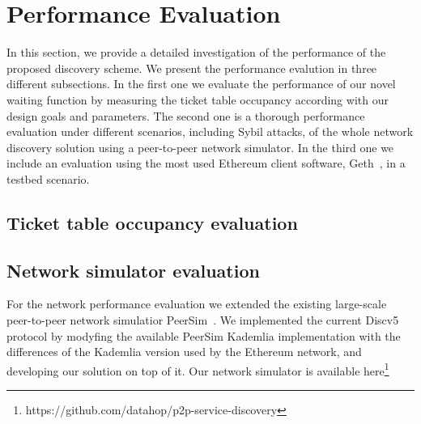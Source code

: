 
\section{Performance Evaluation}
\label{sec:eval}

In  this  section,  we  provide  a  detailed  investigation  of  the performance of the proposed discovery scheme.
We present the performance evalution in three different subsections. 
In the first one we evaluate the performance of our novel waiting function by measuring the ticket table occupancy
according with our design goals and parameters.
The second one is a thorough performance evaluation under different scenarios, including Sybil attacks, of the whole network discovery solution using a peer-to-peer network simulator.
In the third one we include an evaluation using the most used Ethereum client software, Geth~\cite{go-ethereum}, in a testbed scenario.

\subsection{Ticket table occupancy evaluation}


\subsection{Network simulator evaluation}



For the network performance evaluation we extended the existing 
large-scale peer-to-peer network simulatior PeerSim~\cite{p2p09-peersim}.
We implemented the current Discv5 protocol by modyfing the available PeerSim Kademlia implementation with the differences of the Kademlia version used by the Ethereum network, and developing our solution on top of it. Our network simulator is available here\footnote{https://github.com/datahop/p2p-service-discovery}

